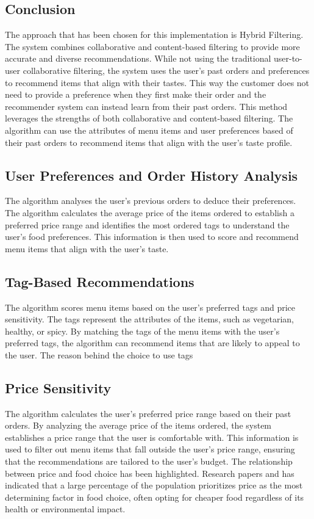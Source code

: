 \subsection*{Conclusion}
The approach that has been chosen for this implementation is Hybrid Filtering. The system combines collaborative and content-based filtering to provide more accurate and diverse recommendations. While not using the traditional user-to-user collaborative filtering, the system uses the user's past orders and preferences to recommend items that align with their tastes. This way the customer does not need to provide a preference when they first make their order and the recommender system can instead learn from their past orders. This method leverages the strengths of both collaborative and content-based filtering. The algorithm can use the attributes of menu items and user preferences based of their past orders to recommend items that align with the user's taste profile.


\subsection{User Preferences and Order History Analysis}
The algorithm analyses the user's previous orders to deduce their preferences. The algorithm calculates the average price of the items ordered to establish a preferred price range and identifies the most ordered tags to understand the user's food preferences. This information is then used to score and recommend menu items that align with the user's taste.

\subsection{Tag-Based Recommendations}
The algorithm scores menu items based on the user's preferred tags and price sensitivity. The tags represent the attributes of the items, such as vegetarian, healthy, or spicy. By matching the tags of the menu items with the user's preferred tags, the algorithm can recommend items that are likely to appeal to the user. The reason behind the choice to use tags 

\subsection{Price Sensitivity}
The algorithm calculates the user's preferred price range based on their past orders. By analyzing the average price of the items ordered, the system establishes a price range that the user is comfortable with. This information is used to filter out menu items that fall outside the user's price range, ensuring that the recommendations are tailored to the user's budget. The relationship between price and food choice has been highlighted. Research papers \cite{34} and \cite{35} has indicated that a large percentage of the population prioritizes price as the most determining factor in food choice, often opting for cheaper food regardless of its health or environmental impact.

